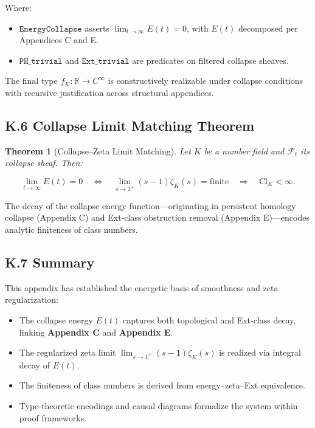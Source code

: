 \documentclass[11pt]{article}
\newtheorem{theorem}{Theorem}[section]
\begin{document}
\noindent
Where:
\begin{itemize}
  \item $\texttt{EnergyCollapse}$ asserts $\lim_{t \to \infty} E(t) = 0$, with $E(t)$ decomposed per Appendices C and E.
  \item $\texttt{PH\_trivial}$ and $\texttt{Ext\_trivial}$ are predicates on filtered collapse sheaves.
\end{itemize}

The final type $f_K : \mathbb{R} \to C^\infty$ is constructively realizable under collapse conditions with recursive justification across structural appendices.

\subsection*{K.6 Collapse Limit Matching Theorem}

\begin{theorem}[Collapse–Zeta Limit Matching]
Let $K$ be a number field and $\mathcal{F}_t$ its collapse sheaf. Then:

\[
\lim_{t \to \infty} E(t) = 0
\quad \Leftrightarrow \quad
\lim_{s \to 1^+} (s-1)\zeta_K(s) = \text{finite}
\quad \Rightarrow \quad
\mathrm{Cl}_K < \infty.
\]
\end{theorem}

The decay of the collapse energy function—originating in persistent homology collapse (Appendix C) and Ext-class obstruction removal (Appendix E)—encodes analytic finiteness of class numbers.

\subsection*{K.7 Summary}

This appendix has established the energetic basis of smoothness and zeta regularization:
\begin{itemize}
  \item The collapse energy $E(t)$ captures both topological and Ext-class decay, linking \textbf{Appendix C} and \textbf{Appendix E}.
  \item The regularized zeta limit $\lim_{s \to 1^+} (s - 1)\zeta_K(s)$ is realized via integral decay of $E(t)$.
  \item The finiteness of class numbers is derived from energy–zeta–Ext equivalence.
  \item Type-theoretic encodings and causal diagrams formalize the system within proof frameworks.
\end{itemize}
\end{document}

